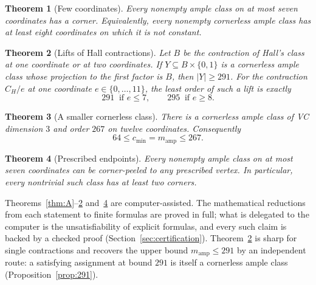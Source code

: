 \documentclass[11pt]{article}
\numberwithin{equation}{section}
\newtheorem{maintheorem}{Theorem}
\theoremstyle{definition}
\theoremstyle{remark}
\newcommand{\cmin}{c_{\min}}
\newcommand{\mamp}{m_{\mathrm{amp}}}
\begin{document}
\begin{maintheorem}[Few coordinates]
\label{thm:B}
Every nonempty ample class on at most seven coordinates has a corner.
Equivalently, every nonempty cornerless ample class has at least eight
coordinates on which it is not constant.
\end{maintheorem}

\begin{maintheorem}[Lifts of Hall contractions]
\label{thm:C}
Let \(B\) be the contraction of Hall's class at one coordinate or at two
coordinates.  If \(Y\subseteq B\times\{0,1\}\) is a cornerless ample class
whose projection to the first factor is \(B\), then \(|Y|\ge291\).  For
the contraction \(C_H/e\) at one coordinate \(e\in\{0,\dots,11\}\), the least
order of such a lift is exactly
\[
 291\ \text{ if } e\le7,\qquad 295\ \text{ if } e\ge8 .
\]
\end{maintheorem}

\begin{maintheorem}[A smaller cornerless class]
\label{thm:D}
There is a cornerless ample class of VC dimension \(3\) and order \(267\) on
twelve coordinates.  Consequently
\[
 64\le\cmin=\mamp\le267 .
\]
\end{maintheorem}

\begin{maintheorem}[Prescribed endpoints]
\label{thm:E}
Every nonempty ample class on at most seven coordinates can be
corner-peeled to any prescribed vertex. In particular, every nontrivial
such class has at least two corners.
\end{maintheorem}

Theorems~\ref{thm:A}--\ref{thm:C} and~\ref{thm:E} are computer-assisted.  The mathematical
reductions from each statement to finite formulas are proved in full; what
is delegated to the computer is the unsatisfiability of explicit formulas,
and every such claim is backed by a checked proof
(Section~\ref{sec:certification}).  Theorem~\ref{thm:C} is sharp for
single contractions and recovers the upper bound \(\mamp\le291\) by an
independent route: a satisfying assignment at bound \(291\) is itself a
cornerless ample class (Proposition~\ref{prop:291}).
\end{document}
